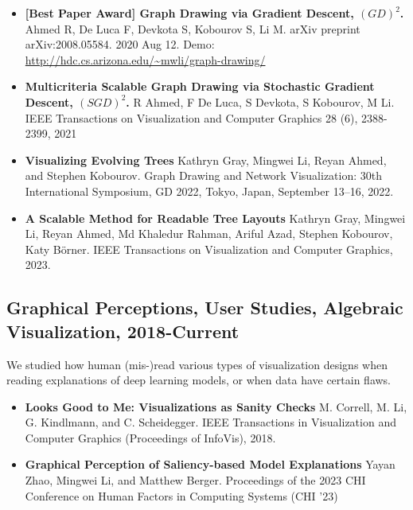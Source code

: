 \documentclass[letterpaper,11pt,oneside]{article}
\begin{document}
\begin{itemize}
    \item \textbf{[Best Paper Award] Graph Drawing via Gradient Descent, $(GD)^2$. }
        Ahmed R, De Luca F, Devkota S, Kobourov S, Li M. 
        arXiv preprint arXiv:2008.05584. 2020 Aug 12. Demo: \url{http://hdc.cs.arizona.edu/~mwli/graph-drawing/}
    \item \textbf{Multicriteria Scalable Graph Drawing via Stochastic Gradient Descent, $(SGD)^2$.}
        R Ahmed, F De Luca, S Devkota, S Kobourov, M Li. 
        IEEE Transactions on Visualization and Computer Graphics 28 (6), 2388-2399, 2021
    \item \textbf{Visualizing Evolving Trees}
        Kathryn Gray, Mingwei Li, Reyan Ahmed, and Stephen Kobourov. 
        Graph Drawing and Network Visualization: 30th International Symposium, GD 2022, Tokyo, Japan, September 13–16, 2022.
    \item \textbf{A Scalable Method for Readable Tree Layouts}
        Kathryn Gray, Mingwei Li, Reyan Ahmed, Md Khaledur Rahman, Ariful Azad, Stephen Kobourov, Katy Börner.
        IEEE Transactions on Visualization and Computer Graphics, 2023.
\end{itemize}


\subsection*{Graphical Perceptions, User Studies, Algebraic Visualization, 2018-Current}
We studied how human (mis-)read various types of visualization designs when reading explanations of deep learning models, or when data have certain flaws.
    \begin{itemize}
        \item \textbf{Looks Good to Me: Visualizations as Sanity Checks}
            M. Correll, M. Li, G. Kindlmann, and C. Scheidegger. 
            IEEE Transactions in Visualization and Computer Graphics (Proceedings of InfoVis), 2018.
        \item \textbf{Graphical Perception of Saliency-based Model Explanations}
            Yayan Zhao, Mingwei Li, and Matthew Berger.
            Proceedings of the 2023 CHI Conference on Human Factors in Computing Systems (CHI '23)
    \end{itemize}
\end{document}
